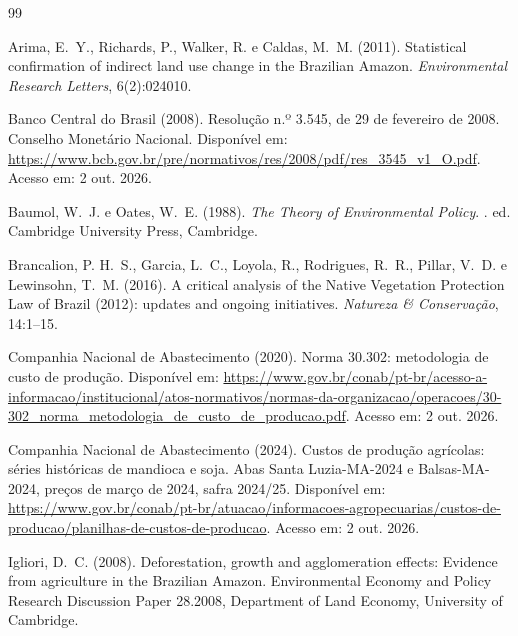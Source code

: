 \documentclass[11pt,a4paper]{article}
\begin{document}
\begin{thebibliography}{99}

Arima, E.~Y., Richards, P., Walker, R. e Caldas, M.~M. (2011).
\newblock Statistical confirmation of indirect land use change in the Brazilian Amazon.
\newblock \textit{Environmental Research Letters}, 6(2):024010.

Banco Central do Brasil (2008).
\newblock Resolução n.º 3.545, de 29 de fevereiro de 2008.
\newblock Conselho Monetário Nacional. Disponível em: \url{https://www.bcb.gov.br/pre/normativos/res/2008/pdf/res_3545_v1_O.pdf}. Acesso em: 2 out. 2026.

Baumol, W.~J. e Oates, W.~E. (1988).
\newblock \textit{The Theory of Environmental Policy}.
. ed. Cambridge University Press, Cambridge.

Brancalion, P. H.~S., Garcia, L.~C., Loyola, R., Rodrigues, R.~R., Pillar, V.~D. e Lewinsohn, T.~M. (2016).
\newblock A critical analysis of the Native Vegetation Protection Law of Brazil (2012): updates and ongoing initiatives.
\newblock \textit{Natureza \& Conservação}, 14:1--15.

Companhia Nacional de Abastecimento (2020).
\newblock Norma 30.302: metodologia de custo de produção.
\newblock Disponível em: \url{https://www.gov.br/conab/pt-br/acesso-a-informacao/institucional/atos-normativos/normas-da-organizacao/operacoes/30-302_norma_metodologia_de_custo_de_producao.pdf}. Acesso em: 2 out. 2026.

Companhia Nacional de Abastecimento (2024).
\newblock Custos de produção agrícolas: séries históricas de mandioca e soja.
\newblock Abas Santa Luzia-MA-2024 e Balsas-MA-2024, preços de março de 2024, safra 2024/25. Disponível em: \url{https://www.gov.br/conab/pt-br/atuacao/informacoes-agropecuarias/custos-de-producao/planilhas-de-custos-de-producao}. Acesso em: 2 out. 2026.

Igliori, D.~C. (2008).
\newblock Deforestation, growth and agglomeration effects: Evidence from agriculture in the Brazilian Amazon.
\newblock Environmental Economy and Policy Research Discussion Paper 28.2008, Department of Land Economy, University of Cambridge.


\end{thebibliography}
\end{document}
